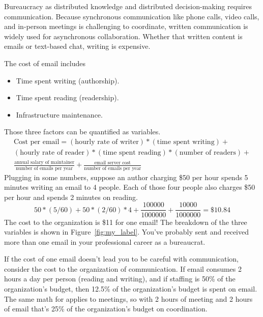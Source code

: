 Bureaucracy as distributed knowledge and distributed decision-making requires communication. Because synchronous communication like phone calls, video calls, and in-person meetings is challenging to coordinate, written communication is widely used for asynchronous collaboration. Whether that written content is emails or text-based chat, writing is expensive.

The cost of email includes
\begin{itemize}
    \item Time spent writing (authorship).
    \item Time spent reading (readership).
    \item Infrastructure maintenance.
\end{itemize}

Those three factors can be quantified as variables. 
%
\begin{multline}
\text{Cost per email} = 
(\text{hourly rate of writer})*(\text{time spent writing}) +\\
(\text{hourly rate of reader})*(\text{time spent reading})*(\text{number of readers})+\\
\frac{\text{annual salary of maintainer}}{\text{number of emails per year}} + \frac{\text{email server cost}}{\text{number of emails per year}}
\end{multline}
Plugging in some numbers, suppose an author charging \$50 per hour spends 5 minutes writing an email to 4 people. Each of those four people also charges \$50 per hour and spends 2 minutes on reading. 
\begin{equation}
50*(5/60) + 50*(2/60)*4 + \frac{100000}{1000000} + \frac{10000}{1000000} = \$10.84
\label{eq:four_readers}
\end{equation}
The cost to the organization is \$11 for one email! The breakdown of the three variables is shown in Figure~\ref{fig:my_label}. You've probably sent and received more than one email in your professional career as a bureaucrat. 


If the cost of one email doesn't lead you to be careful with communication, consider the cost to the organization of communication. If email consumes 2 hours a day per person (reading and writing), and if staffing is 50\% of the organization's budget, then 
12.5\% of the organization's budget is spent on email. The same math for applies to meetings, so with 2 hours of meeting and 2 hours of email that's 25\% of the organization's budget on coordination.

